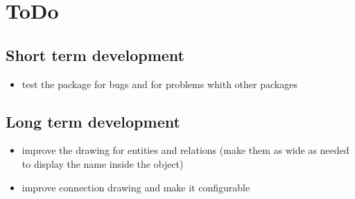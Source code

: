 \documentclass[a4paper,11pt]{article}
\begin{document}
\section{ToDo}

\subsection{Short term development}

\begin{itemize}
\item test the package for bugs and for problems whith other packages
\end{itemize}

\subsection{Long term development}

\begin{itemize}
\item improve the drawing for entities and relations (make them as wide as
  needed to display the name inside the object)
\item improve connection drawing and make it configurable
\end{itemize}
\end{document}
